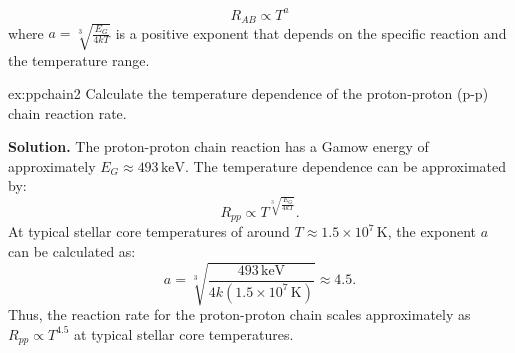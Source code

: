 \begin{theory}
\begin{equation}
R_{AB} \propto T^{a}
\end{equation}
where $a = \sqrt[3]{\frac{E_G}{4kT}}$ is a positive exponent that depends on the specific reaction and the temperature range.
\end{theory}

\begin{example}{}{ex:ppchain2}
Calculate the temperature dependence of the proton-proton (p-p) chain reaction rate.

\smallskip\textbf{Solution.}
The proton-proton chain reaction has a Gamow energy of approximately $E_G \approx 493\,\text{keV}$. The temperature dependence can be approximated by:
\begin{equation}
    R_{pp} \propto T^{\sqrt[3]{\frac{E_G}{4kT}}}.           
\end{equation}
At typical stellar core temperatures of around $T \approx 1.5 \times 10^7\,\text{K}$, the exponent $a$ can be calculated as:
\begin{equation}
    a = \sqrt[3]{\frac{493\,\text{keV}}{4k(1.5 \times 10^7\,\text{K})}} \approx 4.5.    
\end{equation}
Thus, the reaction rate for the proton-proton chain scales approximately as $R_{pp} \propto T^{4.5}$ at typical stellar core temperatures.
\end{example}